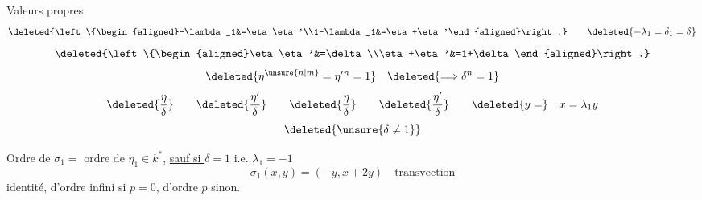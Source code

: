 Valeurs propres 
\[
\deleted{\left\{\begin{aligned}-\lambda_1&=\eta\eta'\\1-\lambda_1&=\eta+\eta'\end{aligned}\right.}
\qquad\deleted{-\lambda_1=\delta_1=\delta}
\]
\[
\deleted{\left\{\begin{aligned}\eta\eta'&=\delta\\\eta+\eta'&=1+\delta\end{aligned}\right.}
\]
\[
\deleted{\eta^{\unsure{n|m}}=\eta'{}^n=1}\quad\deleted{\Longrightarrow\delta^n=1}
\]
\[
\deleted{\frac{\eta}{\delta}}\qquad\deleted{\frac{\eta'}{\delta}}\qquad
\deleted{\frac{\eta}{\delta}}\qquad\deleted{\frac{\eta'}{\delta}}\qquad
\deleted{y=}\quad x=\lambda_1y
\]
\[
\deleted{\unsure{\delta\ne1}}
\]

Ordre de $\sigma_1=$ ordre de $\eta_1\in k^*$, \uline{sauf si $\delta=1$} i.e. $\lambda_1=-1$
\[
\sigma_1(x,y)=(-y,x+2y)\quad\text{transvection}
\]
 identité, d'ordre infini si $p=0$, d'ordre $p$ sinon.
